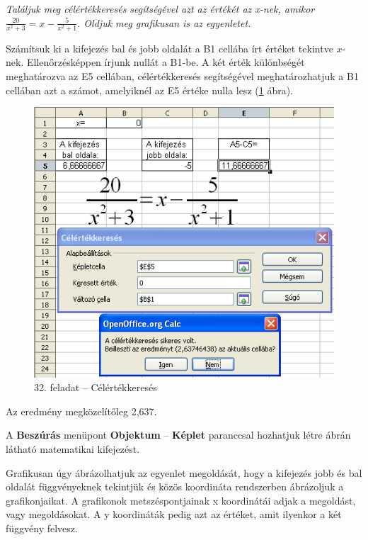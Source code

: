 \textit{Találjuk meg célértékkeresés segítségével azt az
értékét az x-nek, amikor }
$\frac{20}{x^{2}+3}=x-\frac{5}{x^{2}+1}$\textit{.  Oldjuk meg
grafikusan is az egyenletet.}

Számítsuk ki a kifejezés bal és jobb oldalát a B1 cellába
írt értéket tekintve $x$-nek. Ellenőrzésképpen
írjunk nullát a B1-be. A két érték különbségét
meghatározva az E5 cellában, célértékkeresés
segítségével meghatározhatjuk a B1 cellában azt a számot,
amelyiknél az E5 értéke nulla lesz (\ref{32-feladatCélérték} ábra).

\begin{figure}[!h]
\begin{center}
\includegraphics[width=12.674cm]{oocalcv1-img141.png}
\caption{32. feladat --  Célértékkeresés}\label{32-feladatCélérték}
\end{center}
\end{figure}

Az eredmény megközelítőleg 2,637. 

A \textbf{Beszúrás} menüpont \textbf{Objektum} --  \textbf{Képlet}
paranccsal hozhatjuk létre  ábrán látható
matematikai kifejezést.

Grafikusan úgy ábrázolhatjuk az egyenlet megoldását, hogy a
kifejezés jobb és bal oldalát függvényeknek tekintjük és
közös koordináta rendszerben ábrázoljuk a grafikonjaikat. A
grafikonok  metszéspontjainak x koordinátái adjak a megoldást,
vagy megoldásokat. A y koordináták pedig azt az értéket, amit
ilyenkor a két függvény felvesz.

